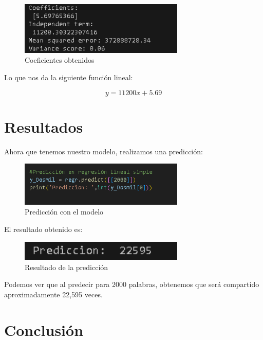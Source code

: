 \documentclass{article}
\begin{document}
\begin{figure}[H]
    \centering
    \includegraphics[width=0.7\textwidth]{img/9.png}
    \caption{Coeficientes obtenidos}
\end{figure}

Lo que nos da la siguiente funci\'on lineal:

\begin{equation}
y = 11200x + 5.69
\end{equation}

\section{Resultados}

Ahora que tenemos nuestro modelo, realizamos una predicci\'on:

\begin{figure}[H]
    \centering
    \includegraphics[width=0.7\textwidth]{img/10.png}
    \caption{Predicci\'on con el modelo}
\end{figure}

El resultado obtenido es:

\begin{figure}[H]
    \centering
    \includegraphics[width=0.7\textwidth]{img/11.png}
    \caption{Resultado de la predicci\'on}
\end{figure}

Podemos ver que al predecir para 2000 palabras, obtenemos que ser\'a compartido aproximadamente 22,595 veces.

\section{Conclusi\'on}
\end{document}
